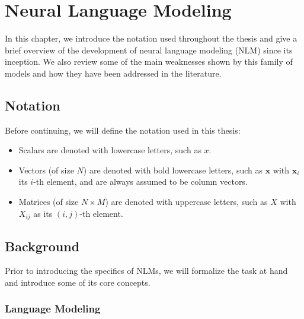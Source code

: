 \chapter{Neural Language Modeling}

In this chapter, we introduce the notation used throughout the thesis and give a brief overview of the development of neural language modeling (NLM) since its inception. We also review some of the main weaknesses shown by this family of models and how they have been addressed in the literature. 


\section{Notation}
\label{sec:notation}

Before continuing, we will define the notation used in this thesis:

\begin{itemize}
	\item Scalars are denoted with lowercase letters, such as $x$.
	
	\item Vectors (of size $N$) are denoted with bold lowercase letters, such as $\mathbf{x}$ with $\mathbf{x}_i$ its $i$-th element, and are always assumed to be column vectors.
	
	\item Matrices (of size $N \times M$) are denoted with uppercase letters, such as $X$ with $X_{ij}$ as its $(i,j)$-th element.
\end{itemize}

\section{Background}
\label{sec:background}

Prior to introducing the specifics of NLMs, we will formalize the task at hand and introduce some of its core concepts. 

\subsection{Language Modeling}

